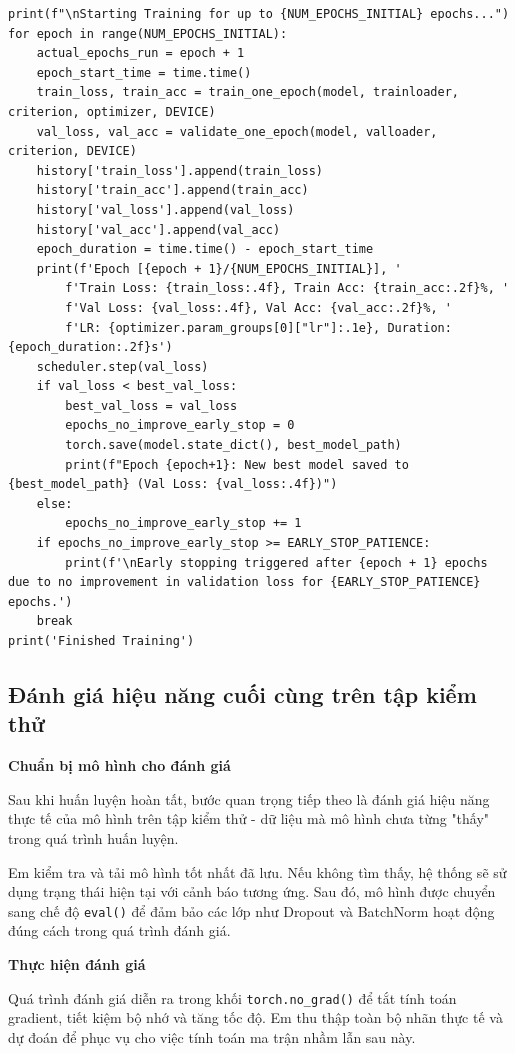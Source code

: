 \documentclass[12pt, a4paper, openany]{report}
\begin{document}
\begin{verbatim}
print(f"\nStarting Training for up to {NUM_EPOCHS_INITIAL} epochs...")
for epoch in range(NUM_EPOCHS_INITIAL):
    actual_epochs_run = epoch + 1
    epoch_start_time = time.time()
    train_loss, train_acc = train_one_epoch(model, trainloader, criterion, optimizer, DEVICE)
    val_loss, val_acc = validate_one_epoch(model, valloader, criterion, DEVICE)
    history['train_loss'].append(train_loss)
    history['train_acc'].append(train_acc)
    history['val_loss'].append(val_loss)
    history['val_acc'].append(val_acc)
    epoch_duration = time.time() - epoch_start_time
    print(f'Epoch [{epoch + 1}/{NUM_EPOCHS_INITIAL}], '
        f'Train Loss: {train_loss:.4f}, Train Acc: {train_acc:.2f}%, '
        f'Val Loss: {val_loss:.4f}, Val Acc: {val_acc:.2f}%, '
        f'LR: {optimizer.param_groups[0]["lr"]:.1e}, Duration: {epoch_duration:.2f}s')
    scheduler.step(val_loss)
    if val_loss < best_val_loss:
        best_val_loss = val_loss
        epochs_no_improve_early_stop = 0
        torch.save(model.state_dict(), best_model_path)
        print(f"Epoch {epoch+1}: New best model saved to {best_model_path} (Val Loss: {val_loss:.4f})")
    else:
        epochs_no_improve_early_stop += 1
    if epochs_no_improve_early_stop >= EARLY_STOP_PATIENCE:
        print(f'\nEarly stopping triggered after {epoch + 1} epochs due to no improvement in validation loss for {EARLY_STOP_PATIENCE} epochs.')
    break
print('Finished Training')
\end{verbatim}

\subsection{Đánh giá hiệu năng cuối cùng trên tập kiểm thử}
\textbf{Chuẩn bị mô hình cho đánh giá}

Sau khi huấn luyện hoàn tất, bước quan trọng tiếp theo là đánh giá hiệu năng thực tế của mô hình trên tập kiểm thử - dữ liệu mà mô hình chưa từng "thấy" trong quá trình huấn luyện. 

Em kiểm tra và tải mô hình tốt nhất đã lưu. Nếu không tìm thấy, hệ thống sẽ sử dụng trạng thái hiện tại với cảnh báo tương ứng. Sau đó, mô hình được chuyển sang chế độ \texttt{eval()} để đảm bảo các lớp như Dropout và BatchNorm hoạt động đúng cách trong quá trình đánh giá.

\textbf{Thực hiện đánh giá}

Quá trình đánh giá diễn ra trong khối \texttt{torch.no\_grad()} để tắt tính toán gradient, tiết kiệm bộ nhớ và tăng tốc độ. Em thu thập toàn bộ nhãn thực tế và dự đoán để phục vụ cho việc tính toán ma trận nhầm lẫn sau này. 
\end{document}
